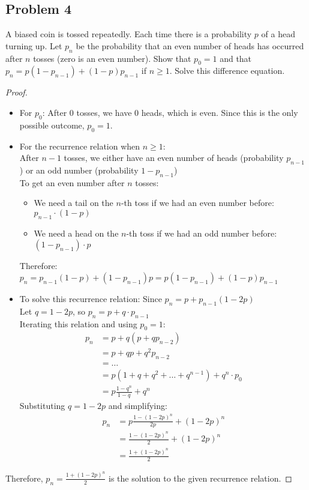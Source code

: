 \documentclass[letterpaper, 11pt]{article}
\newcommand{\1}{\mathds{1}}	%
\theoremstyle{definition}
\begin{document}
\subsection*{Problem 4}
A biased coin is tossed repeatedly. Each time there is a probability $p$ of a head turning up. Let $p_{n}$ be the probability that an even number of heads has occurred after $n$ tosses (zero is an even number). Show that $p_{0}=1$ and that $p_{n}=p(1-p_{n-1})+(1-p)p_{n-1}$ if $n\geq 1$. Solve this difference equation.
\begin{proof}
  \begin{itemize}
    \item For $p_0$: After 0 tosses, we have 0 heads, which is even. Since this is the only possible outcome, $p_0 = 1$.
    \item For the recurrence relation when $n \geq 1$:
\\After $n-1$ tosses, we either have an even number of heads (probability $p_{n-1}$) or an odd number (probability $1-p_{n-1}$)
\\To get an even number after $n$ tosses:
        \begin{itemize}
            \item We need a tail on the $n$-th toss if we had an even number before: $p_{n-1} \cdot (1-p)$
            \item We need a head on the $n$-th toss if we had an odd number before: $(1-p_{n-1}) \cdot p$
        \end{itemize}
Therefore: $p_n = p_{n-1}(1-p) + (1-p_{n-1})p = p(1-p_{n-1})+(1-p)p_{n-1}$
\item To solve this recurrence relation:
  Since $p_n = p + p_{n-1}(1-2p)$
        \\Let $q = 1-2p$, so $p_n = p + q \cdot p_{n-1}$
        \\ Iterating this relation and using $p_0 = 1$:
        \begin{align*}
        p_n &= p + q(p + qp_{n-2}) \\
        &= p + qp + q^2p_{n-2} \\
        &= \ldots \\
        &= p(1 + q + q^2 + \ldots + q^{n-1}) + q^n \cdot p_0 \\
        &= p\frac{1-q^n}{1-q} + q^n
        \end{align*}
Substituting $q = 1-2p$ and simplifying:
        \begin{align*}
        p_n &= p\frac{1-(1-2p)^n}{2p} + (1-2p)^n \\
        &= \frac{1-(1-2p)^n}{2} + (1-2p)^n \\
        &= \frac{1+(1-2p)^n}{2}
        \end{align*}
\end{itemize}

Therefore, $p_n = \frac{1+(1-2p)^n}{2}$ is the solution to the given recurrence relation.
\end{proof}
\end{document}

